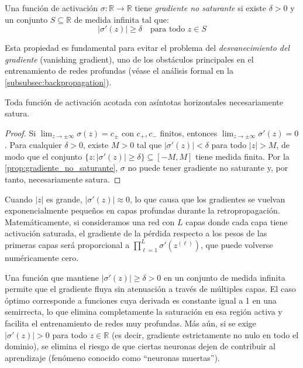 \begin{definition}\label{prop:gradiente_no_saturante}
	Una función de activación $\sigma: \mathbb{R} \to \mathbb{R}$ tiene \textit{gradiente no saturante} si existe $\delta > 0$ y un conjunto $S \subseteq \mathbb{R}$ de medida infinita tal que:
	\[
	|\sigma'(z)| \geq \delta \quad \text{para todo } z \in S
	\]
\end{definition}

Esta propiedad es fundamental para evitar el problema del \textit{desvanecimiento del gradiente} (vanishing gradient), uno de los obstáculos principales en el entrenamiento de redes profundas (véase el análisis formal en la \autoref{subsubsec:backpropagation}).

\begin{corollary}
Toda función de activación acotada con asíntotas horizontales necesariamente satura.
\end{corollary}

\begin{proof}
Si $\lim_{z \to \pm\infty} \sigma(z) = c_{\pm}$ con $c_+, c_-$ finitos, entonces $\lim_{z \to \pm\infty} \sigma'(z) = 0$. Para cualquier $\delta > 0$, existe $M > 0$ tal que $|\sigma'(z)| < \delta$ para todo $|z| > M$, de modo que el conjunto $\{z : |\sigma'(z)| \geq \delta\} \subseteq [-M, M]$ tiene medida finita. Por la \autoref{prop:gradiente_no_saturante}, $\sigma$ no puede tener gradiente no saturante y, por tanto, necesariamente satura.
\end{proof}

Cuando $|z|$ es grande, $|\sigma'(z)| \approx 0$, lo que causa que los gradientes se vuelvan exponencialmente pequeños en capas profundas durante la retropropagación. Matemáticamente, si consideramos una red con $L$ capas donde cada capa tiene activación saturada, el gradiente de la pérdida respecto a los pesos de las primeras capas será proporcional a $\prod_{\ell=1}^{L} \sigma'(z^{(\ell)})$, que puede volverse numéricamente cero.

Una función que mantiene $|\sigma'(z)| \geq \delta > 0$ en un conjunto de medida infinita permite que el gradiente fluya sin atenuación a través de múltiples capas. El caso óptimo corresponde a funciones cuya derivada es constante igual a 1 en una semirrecta, lo que elimina completamente la saturación en esa región activa y facilita el entrenamiento de redes muy profundas. Más aún, si se exige $|\sigma'(z)| > 0$ para todo $z \in \mathbb{R}$ (es decir, gradiente estrictamente no nulo en todo el dominio), se elimina el riesgo de que ciertas neuronas dejen de contribuir al aprendizaje (fenómeno conocido como ``neuronas muertas'').

